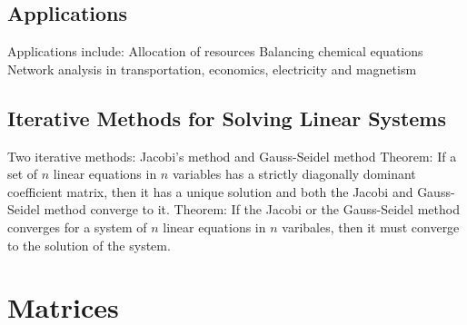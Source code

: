\documentclass{article}
\begin{document}
        \subsection{Applications}
        \begin{outline}
            \1 Applications include: 
                \2 Allocation of resources
                \2 Balancing chemical equations 
                \2 Network analysis in transportation, economics, electricity and magnetism
        \end{outline}
        \subsection{Iterative Methods for Solving Linear Systems}
        \begin{outline}
            \1 Two iterative methods: Jacobi's method and Gauss-Seidel method 
            \1 Theorem: If a set of $n$ linear equations in $n$ variables has a strictly diagonally dominant coefficient matrix, then it has a unique solution and both the Jacobi and Gauss-Seidel method converge to it. 
            \1 Theorem: If the Jacobi or the Gauss-Seidel method converges for a system of $n$ linear equations in $n$ varibales, then it must converge to the solution of the system. 

        \end{outline}
    \section{Matrices} %
\end{document}
